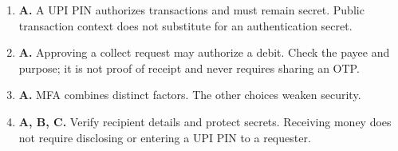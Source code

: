 \begin{enumerate}[label=\textbf{Q\arabic*.}, leftmargin=*]
\item \textbf{A.} A UPI PIN authorizes transactions and must remain secret. Public transaction context does not substitute for an authentication secret.

\item \textbf{A.} Approving a collect request may authorize a debit. Check the payee and purpose; it is not proof of receipt and never requires sharing an OTP.

\item \textbf{A.} MFA combines distinct factors. The other choices weaken security.

\item \textbf{A, B, C.} Verify recipient details and protect secrets. Receiving money does not require disclosing or entering a UPI PIN to a requester.

\end{enumerate}
